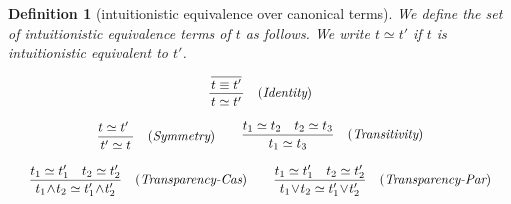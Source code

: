 \documentclass[12pt]{article}
\newtheorem{Definition}{Definition}[section]
\begin{document}
\pagebreak
\begin{Definition}[intuitionistic equivalence over canonical terms]
  \label{equality_on_CANONICALS}
  We define the set of intuitionistic equivalence terms of $t$ as follows.
  We write $t \simeq t'$ if $t$ is intuitionistic equivalent to $t'$.
  \begin{displaymath}
    \begin{array}{c}
      
      \begin{array}{rl}
          \dfrac{
            \dfrac{}{
              \raisebox{0.5ex}[2.3ex][0ex]{$t \equiv t'$}
            }
          }{
            t \simeq t'
          }  &  (\text{\it Identity})
      \end{array}  \\
      \\
      
      \begin{array}{rl}
        \begin{array}{rl}
          \dfrac{
            t \simeq t'\
          }{
            t' \simeq t
          }  &  (\text{\it Symmetry})
        \end{array}
        
        & \begin{array}{rl}
            \dfrac{t_1 \simeq t_2 \quad t_2 \simeq t_3}{
              t_1 \simeq t_3
            }  &  (\text{\it Transitivity})
          \end{array}
      \end{array}  \\
      \\
      
      \begin{array}{ll}
        \begin{array}{rl}
          \dfrac{t_1 \simeq t'_1 \quad t_2 \simeq t'_2}{
            t_1 \!\wedge\! t_2 \simeq t'_1 \!\wedge\! t'_2
          }  &  (\text{\it Transparency-Cas})
        \end{array}
        
        & \begin{array}{rl}
            \dfrac{t_1 \simeq t'_1 \quad t_2 \simeq t'_2}{
              t_1 \!\vee\! t_2 \simeq t'_1 \!\vee\! t'_2
            }  &  (\text{\it Transparency-Par})
          \end{array}
      \end{array}  \\
      \\


\end{array}
\end{displaymath}
\end{Definition}
\end{document}
